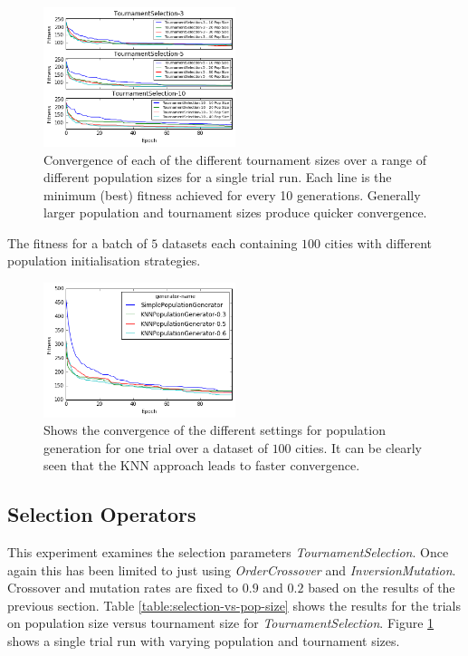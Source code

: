 \documentclass[journal]{IEEEtran}
\begin{document}
\begin{figure}[H]
\centering
\includegraphics[width=0.5\textwidth]{figures/selection_vs_pop_size_convergence.png}
\caption{Convergence of each of the different tournament sizes over a range of different population sizes for a single trial run. Each line is the minimum (best) fitness achieved for every 10 generations. Generally larger population and tournament sizes produce quicker convergence.}
\label{fig:tournament-selection-convergence}
\end{figure}


\begin{table}[t]
\centering

\caption{The fitness for a batch of $5$ datasets each containing $100$ cities with different population initialisation strategies.}
\label{table:knn-fitness}
\end{table}

\newpage

\begin{figure}[H]
\centering
\includegraphics[width=0.5\textwidth]{figures/knn_convergence.png}
\caption{Shows the convergence of the different settings for population generation for one trial over a dataset of $100$ cities. It can be clearly seen that the KNN approach leads to faster convergence.}
\label{fig:knn-convergence}
\end{figure}

\subsection{Selection Operators}
\label{subsec:selection-parameters}
This experiment examines the selection parameters \textit{TournamentSelection}. Once again this has been limited to just using \textit{OrderCrossover} and \textit{InversionMutation}. Crossover and mutation rates are fixed to $0.9$ and $0.2$ based on the results of the previous section. Table \ref{table:selection-vs-pop-size} shows the results for the trials on population size versus tournament size for \textit{TournamentSelection}. Figure \ref{fig:tournament-selection-convergence} shows a single trial run with varying population and tournament sizes.
\end{document}
